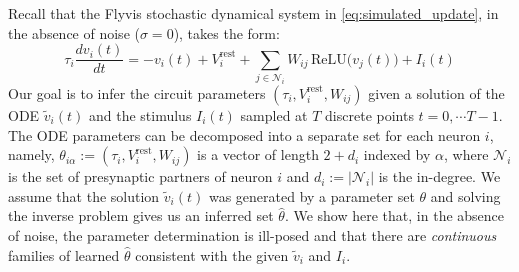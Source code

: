 \documentclass{article}
\def\vrest{V^{\mathrm{rest}}}
\begin{document}
Recall that the Flyvis stochastic dynamical system in \cref{eq:simulated_update}, in the absence of noise ($\sigma=0$), takes the form:
\begin{equation}
    \tau_i\frac{dv_i(t)}{dt} = -v_i(t) + \vrest_i
+ \sum_{j\in\mathcal{N}_i} W_{ij}\,\text{ReLU}\!\big(v_j(t)\big)
+ I_i(t) \label{eq:Flyvis-app-noise-free-ode}
\end{equation}
Our goal is to infer the circuit parameters $(\tau_i, \vrest_i, W_{ij})$ given a solution of the ODE $\tilde{v}_i(t)$ and the stimulus $I_i(t)$ sampled at $T$ discrete points $t=0, \cdots T-1$. The ODE parameters can be decomposed into a separate set for each neuron $i$, namely, $\theta_{i\alpha} := (\tau_i, \vrest_i, W_{ij})$ is a vector of length $2 + d_i$ indexed by $\alpha$, where $\mathcal{N}_i$ is the set of presynaptic partners of neuron $i$ and $d_i := |\mathcal{N}_i|$ is the in-degree. We assume that the solution $\tilde{v}_i(t)$ was generated by a parameter set $\theta$ and solving the inverse problem gives us an inferred set $\hat{\theta}$. We show here that, in the absence of noise, the parameter determination is ill-posed and that there are \emph{continuous} families of learned $\hat{\theta}$ consistent with the given $\tilde{v}_i$ and $I_i$.
\end{document}
